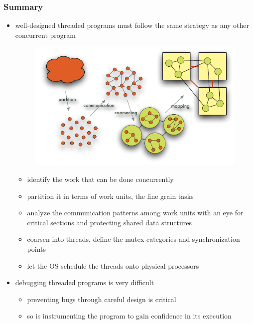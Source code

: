 \begin{frame}[fragile]
%
  \frametitle{Summary}
%
  \begin{itemize}
%
  \item well-designed threaded programs must follow the same strategy as any other concurrent
    program
    \begin{figure}
      \centering
      \includegraphics[scale=0.5]{figures/parallelization-steps.pdf}
      \label{fig:parallelization-steps-threads}
    \end{figure}
    \vspace{-1.75em}
%
    \begin{itemize}
    \item identify the work that can be done concurrently
    \item partition it in terms of work units, the fine grain tasks
    \item analyze the communication patterns among work units with an eye for critical sections
      and protecting shared data structures
    \item coarsen into threads, define the mutex categories and synchronization points
    \item let the OS schedule the threads onto physical processors
    \end{itemize}
%
  \item debugging threaded programs is very difficult
    \begin{itemize}
    \item preventing bugs through careful design is critical
    \item so is instrumenting the program to gain confidence in its execution
    \end{itemize}
%
  \end{itemize}
%
\end{frame}

